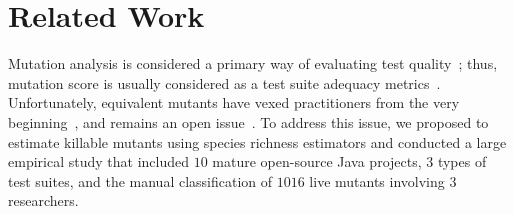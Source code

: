 \documentclass[sigconf,review,anonymous]{acmart}
\begin{document}
\section{Related Work}


Mutation analysis is considered a primary way of evaluating test quality~\cite{papadakis2019mutation};
thus, mutation score is usually considered as a test suite adequacy metrics~\cite{just2014are,andrews2005is,andrews2006using,daran1996software}. 
Unfortunately, equivalent mutants have vexed practitioners from the very beginning~\cite{budd1982two},
and remains an open issue~\cite{madeyski2014overcoming}.
%
To address this issue, we proposed to estimate killable mutants using
species richness estimators and conducted a large empirical study that included
$10$ mature open-source Java projects, $3$ types of test suites, and the 
manual classification of $1016$ live mutants involving $3$ researchers.
\end{document}
